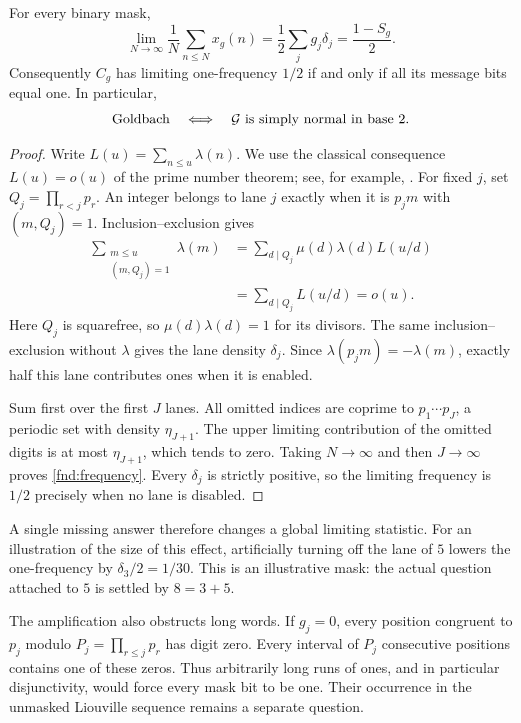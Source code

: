 \begin{theorem}\label{fnd:balance}
For every binary mask,
\begin{equation}
 \lim_{N\to\infty}\frac1N\sum_{n\le N}x_g(n)
 =\frac12\sum_jg_j\delta_j=\frac{1-S_g}{2}.
 \label{fnd:frequency}
\end{equation}
Consequently $C_g$ has limiting one-frequency $1/2$ if and only if
all its message bits equal one.  In particular,
\begin{equation}
 \mathrm{Goldbach}\quad\Longleftrightarrow\quad \mathcal G\text{ is simply normal in base }2.
 \label{fnd:goldbach-balance}
\end{equation}
\end{theorem}
\begin{proof}
Write $L(u)=\sum_{n\le u}\lambda(n)$.  We use the classical consequence
$L(u)=o(u)$ of the prime number theorem; see, for example,
\cite[Section 2]{fndHumphries2013}.  For fixed $j$, set
$Q_j=\prod_{r<j}p_r$.  An integer belongs to lane $j$ exactly when it
is $p_jm$ with $(m,Q_j)=1$.  Inclusion--exclusion gives
\begin{align*}
 \sum_{\substack{m\le u\\(m,Q_j)=1}}\lambda(m)
 &=\sum_{d\mid Q_j}\mu(d)\lambda(d)L(u/d)\\
 &=\sum_{d\mid Q_j}L(u/d)=o(u).
\end{align*}
Here $Q_j$ is squarefree, so $\mu(d)\lambda(d)=1$ for its divisors.
The same inclusion--exclusion without $\lambda$ gives the lane density
$\delta_j$.  Since $\lambda(p_jm)=-\lambda(m)$, exactly half this
lane contributes ones when it is enabled.

Sum first over the first $J$ lanes.  All omitted indices are coprime
to $p_1\cdots p_J$, a periodic set with density $\eta_{J+1}$.
The upper limiting contribution of the omitted digits is at most
$\eta_{J+1}$, which tends to zero.  Taking $N\to\infty$ and then
$J\to\infty$ proves \eqref{fnd:frequency}.  Every $\delta_j$ is
strictly positive, so the limiting frequency is $1/2$ precisely when
no lane is disabled.
\end{proof}

A single missing answer therefore changes a global limiting statistic.
For an illustration of the size of this effect, artificially turning
off the lane of $5$ lowers the one-frequency by $\delta_3/2=1/30$.
This is an illustrative mask: the actual question attached to $5$ is
settled by $8=3+5$.

The amplification also obstructs long words.  If $g_j=0$, every
position congruent to $p_j$ modulo $P_j=\prod_{r\le j}p_r$ has digit
zero.  Every interval of $P_j$ consecutive positions contains one of
these zeros.  Thus arbitrarily long runs of ones, and in particular
disjunctivity, would force every mask bit to be one.  Their occurrence
in the unmasked Liouville sequence remains a separate question.

